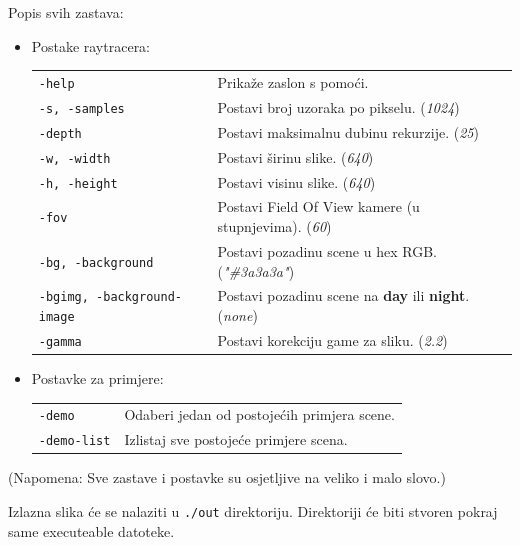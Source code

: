 \documentclass[
12pt, %
oneside, %
english, %
singlespacing, %
parskip, %
headsepline, %
chapterinoneline, %
consistentlayout, %
]{MastersDoctoralThesis} %
\begin{document}
Popis svih zastava:
\begin{itemize}
	\item Postake raytracera: \\
	      \begin{tabular}{ l l }
		      \texttt{-help}                     & Prikaže zaslon s pomoći.                                                 \\
		      \texttt{-s, -samples}              & Postavi broj uzoraka po pikselu. (\emph{1024})                           \\
		      \texttt{-depth}                    & Postavi maksimalnu dubinu rekurzije. (\emph{25})                         \\
		      \texttt{-w, -width}                & Postavi širinu slike. (\emph{640})                                       \\
		      \texttt{-h, -height}               & Postavi visinu slike. (\emph{640})                                       \\
		      \texttt{-fov}                      & Postavi Field Of View kamere (u stupnjevima). (\emph{60})                \\
		      \texttt{-bg, -background}          & Postavi pozadinu scene u hex RGB. (\emph{"\#3a3a3a"})                    \\
		      \texttt{-bgimg, -background-image} & Postavi pozadinu scene na \textbf{day} ili \textbf{night}. (\emph{none}) \\
		      \texttt{-gamma}                    & Postavi korekciju game za sliku. (\emph{2.2})
	      \end{tabular}
	\item Postavke za primjere: \\
	      \begin{tabular}{ l l }
		      \texttt{-demo}      & Odaberi jedan od postojećih primjera scene. \\
		      \texttt{-demo-list} & Izlistaj sve postojeće primjere scena.
	      \end{tabular}
\end{itemize}

(Napomena: Sve zastave i postavke su osjetljive na veliko i malo slovo.)

Izlazna slika će se nalaziti u \texttt{./out} direktoriju. Direktoriji će biti
stvoren pokraj same executeable datoteke.
\end{document}
